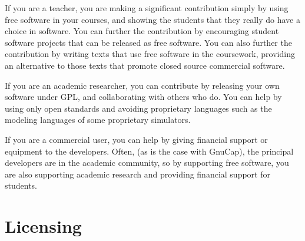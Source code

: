 If you are a teacher, you are making a significant contribution simply
by using free software in your courses, and showing the students that
they really do have a choice in software. You can further the
contribution by encouraging student software projects that can be
released as free software. You can also further the contribution by
writing texts that use free software in the coursework, providing an
alternative to those texts that promote closed source commercial
software.

If you are an academic researcher, you can contribute by releasing
your own software under GPL, and collaborating with others who do. You
can help by using only open standards and avoiding proprietary
languages such as the modeling languages of some proprietary
simulators.

If you are a commercial user, you can help by giving financial support
or equipment to the developers. Often, (as is the case with GnuCap),
the principal developers are in the academic community, so by
supporting free software, you are also supporting academic research
and providing financial support for students.
\section{Licensing}
	
